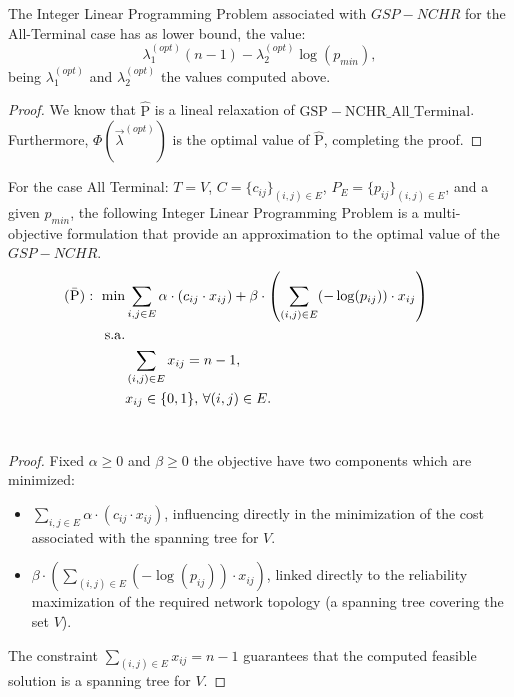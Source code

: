 \begin{lemma} The Integer Linear Programming Problem associated with $GSP-NCHR$
for the All-Terminal case has as lower bound, the value:
\[\lambda^{(opt)}_{1}(n-1)-\lambda^{(opt)}_{2}\log(p_{min}),\]
being $\lambda^{(opt)}_{1}$ and $\lambda^{(opt)}_{2}$ the values
computed above.
\end{lemma}
\begin{proof} We know that $\mathrm{\hat{P}}$ is a lineal relaxation of
$\mathrm{GSP-NCHR\_All\_Terminal}$. Furthermore,
$\Phi(\vec{\lambda}^{(opt)})$ is the optimal value of
$\mathrm{\hat{P}}$, completing the proof.
\end{proof}

\begin{lemma} For the case All Terminal: $T=V$, $C=\{c_{ij}\}_{(i,j)\in E}$, $P_{E}=\{p_{ij}\}_{(i,j)\in
E}$, and a given $p_{min}$, the following Integer Linear
Programming Problem is a multi-objective formulation that provide
an approximation to the optimal value of the $GSP-NCHR$.
\begin{align}
 \textsc{($\bar{\mathrm{P}}$)}:~ \mathrm{min} &  \sum_{i,j\in E} \alpha\cdot (c_{ij}\cdot x_{ij})+\beta\cdot \left(\sum_{(i,j)\in E} (-\log(p_{ij}))\cdot x_{ij}\right)   \nonumber\\
 \mathrm{s.a.} & \nonumber\\
 &                  \sum_{(i,j)\in E} x_{ij}=n-1, & \nonumber &\\
 &                 x_{ij}\in \{0,1\},\, \forall (i,j)\in E.   & \nonumber  &
\end{align}~\\
\end{lemma}
\begin{proof} Fixed $\alpha\geq 0$ and $\beta\geq 0$ the objective have
two components which are minimized:
\begin{itemize}
    \item $\sum_{i,j\in E} \alpha\cdot (c_{ij}\cdot x_{ij})$,
    influencing directly in the minimization of the cost
    associated with the spanning tree for $V$.
    \item $\beta\cdot (\sum_{(i,j)\in E} (-\log(p_{ij}))\cdot x_{ij})$, linked
    directly to the reliability maximization of the required
    network topology (a spanning tree covering the set $V$).
\end{itemize}
The constraint $\sum_{(i,j)\in E} x_{ij}=n-1$ guarantees that the
computed feasible solution is a spanning tree for $V$.
\end{proof}
 
